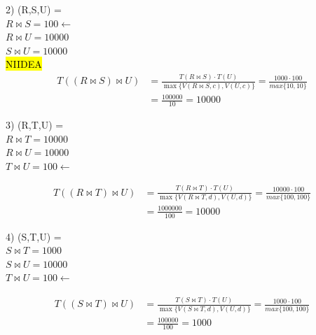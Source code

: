 \documentclass{templateNote}
\begin{document}
\begin{enumerate}
\begin{enumerate}[label=\alph*)]
                2) (R,S,U) = \\
                \hspace*{0.25cm}$R \Join S = 100 \leftarrow$ \\
                \hspace*{0.25cm}$R \Join U = 10000$ \\
                \hspace*{0.25cm}$S \Join U = 10000$ \\

                \hl{NIIDEA}
                \begin{align*}
                    T((R \Join S) \Join U) &= \frac{T(R \Join S)\cdot T(U)}{\max\{V(R \Join S,c),V(U,c)\}} = \frac{1000\cdot100}{max\{10,10\}} \\ 
                    &= \frac{100000}{10} = 10000
                \end{align*}
                
                3) (R,T,U) = \\
                \hspace*{0.25cm}$R \Join T = 10000$ \\
                \hspace*{0.25cm}$R \Join U = 10000$ \\
                \hspace*{0.25cm}$T \Join U = 100 \leftarrow$

                \begin{align*}
                    T((R \Join T) \Join U) &= \frac{T(R \Join T)\cdot T(U)}{\max\{V(R \Join T,d),V(U,d)\}} = \frac{10000\cdot100}{max\{100,100\}} \\ 
                    &= \frac{1000000}{100} = 10000
                \end{align*}

                4) (S,T,U) = \\
                \hspace*{0.25cm}$S \Join T = 1000$ \\
                \hspace*{0.25cm}$S \Join U = 10000$ \\
                \hspace*{0.25cm}$T \Join U = 100 \leftarrow$

                \begin{align*}
                    T((S \Join T) \Join U) &= \frac{T(S \Join T)\cdot T(U)}{\max\{V(S \Join T,d),V(U,d)\}} = \frac{1000\cdot100}{max\{100,100\}} \\ 
                    &= \frac{100000}{100} = 1000
                \end{align*}


\end{enumerate}
\end{enumerate}
\end{document}
